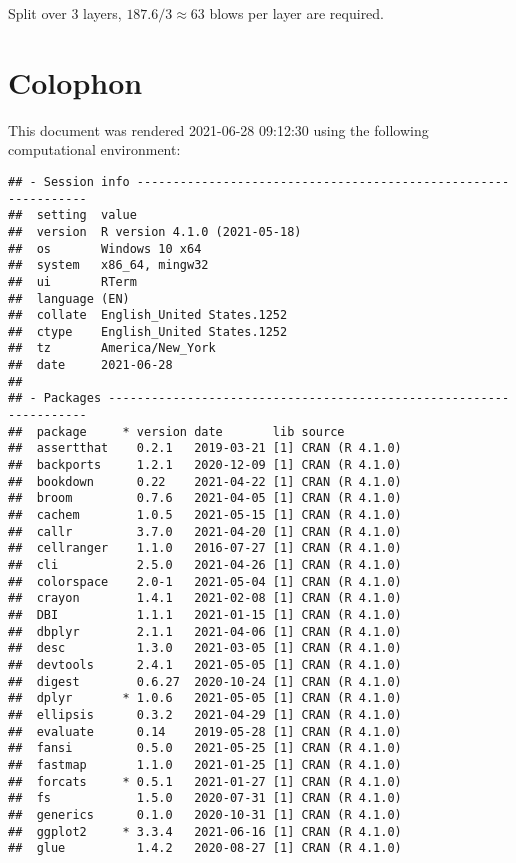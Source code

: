 \documentclass[
  letterpaper,
  openany]{book}
\begin{document}
Split over 3 layers, \(187.6 / 3 \approx 63\) blows per layer are required.

\hypertarget{colophon}{%
\section{Colophon}\label{colophon}}

This document was rendered 2021-06-28 09:12:30 using the following computational environment:

\begin{verbatim}
## - Session info ---------------------------------------------------------------
##  setting  value                       
##  version  R version 4.1.0 (2021-05-18)
##  os       Windows 10 x64              
##  system   x86_64, mingw32             
##  ui       RTerm                       
##  language (EN)                        
##  collate  English_United States.1252  
##  ctype    English_United States.1252  
##  tz       America/New_York            
##  date     2021-06-28                  
## 
## - Packages -------------------------------------------------------------------
##  package     * version date       lib source        
##  assertthat    0.2.1   2019-03-21 [1] CRAN (R 4.1.0)
##  backports     1.2.1   2020-12-09 [1] CRAN (R 4.1.0)
##  bookdown      0.22    2021-04-22 [1] CRAN (R 4.1.0)
##  broom         0.7.6   2021-04-05 [1] CRAN (R 4.1.0)
##  cachem        1.0.5   2021-05-15 [1] CRAN (R 4.1.0)
##  callr         3.7.0   2021-04-20 [1] CRAN (R 4.1.0)
##  cellranger    1.1.0   2016-07-27 [1] CRAN (R 4.1.0)
##  cli           2.5.0   2021-04-26 [1] CRAN (R 4.1.0)
##  colorspace    2.0-1   2021-05-04 [1] CRAN (R 4.1.0)
##  crayon        1.4.1   2021-02-08 [1] CRAN (R 4.1.0)
##  DBI           1.1.1   2021-01-15 [1] CRAN (R 4.1.0)
##  dbplyr        2.1.1   2021-04-06 [1] CRAN (R 4.1.0)
##  desc          1.3.0   2021-03-05 [1] CRAN (R 4.1.0)
##  devtools      2.4.1   2021-05-05 [1] CRAN (R 4.1.0)
##  digest        0.6.27  2020-10-24 [1] CRAN (R 4.1.0)
##  dplyr       * 1.0.6   2021-05-05 [1] CRAN (R 4.1.0)
##  ellipsis      0.3.2   2021-04-29 [1] CRAN (R 4.1.0)
##  evaluate      0.14    2019-05-28 [1] CRAN (R 4.1.0)
##  fansi         0.5.0   2021-05-25 [1] CRAN (R 4.1.0)
##  fastmap       1.1.0   2021-01-25 [1] CRAN (R 4.1.0)
##  forcats     * 0.5.1   2021-01-27 [1] CRAN (R 4.1.0)
##  fs            1.5.0   2020-07-31 [1] CRAN (R 4.1.0)
##  generics      0.1.0   2020-10-31 [1] CRAN (R 4.1.0)
##  ggplot2     * 3.3.4   2021-06-16 [1] CRAN (R 4.1.0)
##  glue          1.4.2   2020-08-27 [1] CRAN (R 4.1.0)

\end{verbatim}
\end{document}
